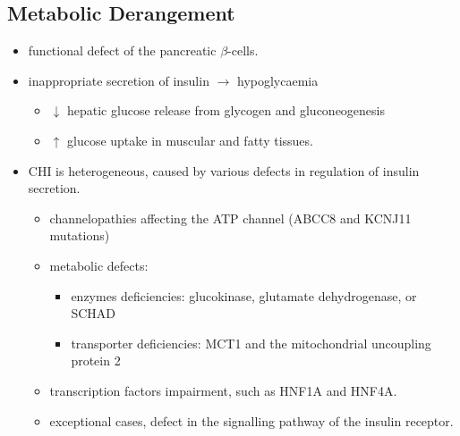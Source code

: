 \documentclass{scrartcl}
\begin{document}
\subsection{Metabolic Derangement}
\label{sec:org37f2cb8}
\begin{itemize}
\item functional defect of the pancreatic \(\beta\)-cells.
\item inappropriate secretion of insulin \(\to\) hypoglycaemia
\begin{itemize}
\item \(\downarrow\) hepatic glucose release from glycogen and gluconeogenesis
\item \(\uparrow\) glucose uptake in muscular and fatty tissues.
\end{itemize}
\item CHI is heterogeneous, caused by various defects in regulation of insulin secretion.
\begin{itemize}
\item channelopathies affecting the ATP channel (ABCC8 and KCNJ11 mutations)
\item metabolic defects:
\begin{itemize}
\item enzymes deficiencies: glucokinase, glutamate dehydrogenase, or SCHAD
\item transporter deficiencies: MCT1 and the mitochondrial uncoupling protein 2
\end{itemize}
\item transcription factors impairment, such as HNF1A and HNF4A.
\item exceptional cases, defect in the signalling pathway of the insulin
receptor.
\end{itemize}
\end{itemize}
\end{document}
